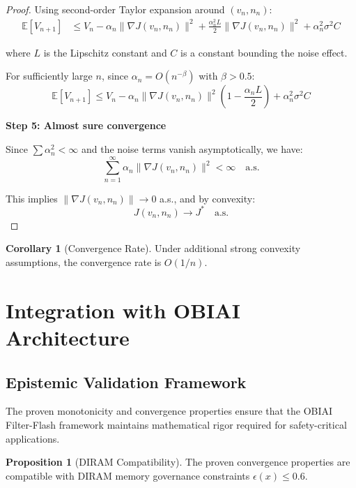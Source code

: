 \documentclass[11pt]{article}
\theoremstyle{definition}
\newtheorem{proposition}{Proposition}
\newtheorem{corollary}{Corollary}
\begin{document}
\begin{proof}
Using second-order Taylor expansion around $(v_n, n_n)$:
\begin{align}
\mathbb{E}[V_{n+1}] &\leq V_n - \alpha_n \|\nabla J(v_n, n_n)\|^2 + \frac{\alpha_n^2 L}{2} \|\nabla J(v_n, n_n)\|^2 + \alpha_n^2 \sigma^2 C
\end{align}

where $L$ is the Lipschitz constant and $C$ is a constant bounding the noise effect.

For sufficiently large $n$, since $\alpha_n = O(n^{-\beta})$ with $\beta > 0.5$:
\begin{equation}
\mathbb{E}[V_{n+1}] \leq V_n - \alpha_n \|\nabla J(v_n, n_n)\|^2 (1 - \frac{\alpha_n L}{2}) + \alpha_n^2 \sigma^2 C
\end{equation}

\textbf{Step 5: Almost sure convergence}

Since $\sum \alpha_n^2 < \infty$ and the noise terms vanish asymptotically, we have:
\begin{equation}
\sum_{n=1}^\infty \alpha_n \|\nabla J(v_n, n_n)\|^2 < \infty \quad \text{a.s.}
\end{equation}

This implies $\|\nabla J(v_n, n_n)\| \to 0$ a.s., and by convexity:
\begin{equation}
J(v_n, n_n) \to J^* \quad \text{a.s.}
\end{equation}
\end{proof}

\begin{corollary}[Convergence Rate]
Under additional strong convexity assumptions, the convergence rate is $O(1/n)$.
\end{corollary}

\section{Integration with OBIAI Architecture}

\subsection{Epistemic Validation Framework}

The proven monotonicity and convergence properties ensure that the OBIAI Filter-Flash framework maintains mathematical rigor required for safety-critical applications.

\begin{proposition}[DIRAM Compatibility]
The proven convergence properties are compatible with DIRAM memory governance constraints $\epsilon(x) \leq 0.6$.
\end{proposition}
\end{document}
